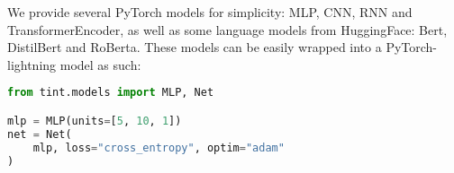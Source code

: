We provide several PyTorch models for simplicity: MLP, CNN, RNN and TransformerEncoder, as well as some language models
from HuggingFace: Bert, DistilBert and RoBerta.
These models can be easily wrapped into a PyTorch-lightning model as such:

\begin{lstlisting}[language=Python, caption=Model definition example, label={lst:model}]
from tint.models import MLP, Net

mlp = MLP(units=[5, 10, 1])
net = Net(
    mlp, loss="cross_entropy", optim="adam"
)
\end{lstlisting}
